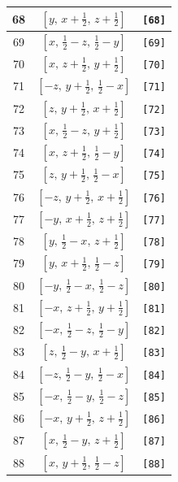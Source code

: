 \documentclass[fleqn,8pt]{jsarticle}
\begin{document}
\begin{longtable}{ccc}
68 & $\left[ y,\, x + \frac{1}{2},\, z + \frac{1}{2} \right]$ & {\tt [68]} \\ \hline
69 & $\left[ x,\, \frac{1}{2} - z,\, \frac{1}{2} - y \right]$ & {\tt [69]} \\ \hline
70 & $\left[ x,\, z + \frac{1}{2},\, y + \frac{1}{2} \right]$ & {\tt [70]} \\ \hline
71 & $\left[ - z,\, y + \frac{1}{2},\, \frac{1}{2} - x \right]$ & {\tt [71]} \\ \hline
72 & $\left[ z,\, y + \frac{1}{2},\, x + \frac{1}{2} \right]$ & {\tt [72]} \\ \hline
73 & $\left[ x,\, \frac{1}{2} - z,\, y + \frac{1}{2} \right]$ & {\tt [73]} \\ \hline
74 & $\left[ x,\, z + \frac{1}{2},\, \frac{1}{2} - y \right]$ & {\tt [74]} \\ \hline
75 & $\left[ z,\, y + \frac{1}{2},\, \frac{1}{2} - x \right]$ & {\tt [75]} \\ \hline
76 & $\left[ - z,\, y + \frac{1}{2},\, x + \frac{1}{2} \right]$ & {\tt [76]} \\ \hline
77 & $\left[ - y,\, x + \frac{1}{2},\, z + \frac{1}{2} \right]$ & {\tt [77]} \\ \hline
78 & $\left[ y,\, \frac{1}{2} - x,\, z + \frac{1}{2} \right]$ & {\tt [78]} \\ \hline
79 & $\left[ y,\, x + \frac{1}{2},\, \frac{1}{2} - z \right]$ & {\tt [79]} \\ \hline
80 & $\left[ - y,\, \frac{1}{2} - x,\, \frac{1}{2} - z \right]$ & {\tt [80]} \\ \hline
81 & $\left[ - x,\, z + \frac{1}{2},\, y + \frac{1}{2} \right]$ & {\tt [81]} \\ \hline
82 & $\left[ - x,\, \frac{1}{2} - z,\, \frac{1}{2} - y \right]$ & {\tt [82]} \\ \hline
83 & $\left[ z,\, \frac{1}{2} - y,\, x + \frac{1}{2} \right]$ & {\tt [83]} \\ \hline
84 & $\left[ - z,\, \frac{1}{2} - y,\, \frac{1}{2} - x \right]$ & {\tt [84]} \\ \hline
85 & $\left[ - x,\, \frac{1}{2} - y,\, \frac{1}{2} - z \right]$ & {\tt [85]} \\ \hline
86 & $\left[ - x,\, y + \frac{1}{2},\, z + \frac{1}{2} \right]$ & {\tt [86]} \\ \hline
87 & $\left[ x,\, \frac{1}{2} - y,\, z + \frac{1}{2} \right]$ & {\tt [87]} \\ \hline
88 & $\left[ x,\, y + \frac{1}{2},\, \frac{1}{2} - z \right]$ & {\tt [88]} \\ \hline

\end{longtable}
\end{document}
